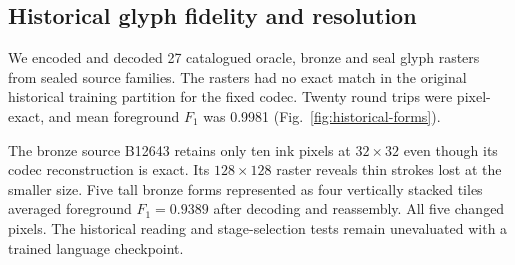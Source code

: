 \subsection*{Historical glyph fidelity and resolution}
We encoded and decoded 27 catalogued oracle, bronze and seal glyph rasters
from sealed source families. The rasters had no exact match in the original
historical training partition for the fixed codec. Twenty round trips were
pixel-exact, and mean foreground $F_1$ was 0.9981 (Fig.~\ref{fig:historical-forms}).

The bronze source B12643 retains only ten ink pixels at $32\times32$ even
though its codec reconstruction is exact. Its $128\times128$ raster reveals
thin strokes lost at the smaller size. Five tall bronze forms represented as
four vertically stacked tiles averaged foreground $F_1=0.9389$ after decoding
and reassembly. All five changed pixels. The historical reading and
stage-selection tests remain unevaluated with a trained language checkpoint.


